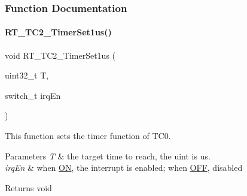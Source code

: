 \subsubsection{Function Documentation}
\mbox{\label{a00047_a295c11e348fa97400f36ddf1ece55368}} 
\paragraph{\texorpdfstring{R\+T\+\_\+\+T\+C2\+\_\+\+Timer\+Set1us()}{RT\_TC2\_TimerSet1us()}}
{\footnotesize\ttfamily void R\+T\+\_\+\+T\+C2\+\_\+\+Timer\+Set1us (\begin{DoxyParamCaption}\item[{uint32\+\_\+t}]{T,  }\item[{switch\+\_\+t}]{irq\+En }\end{DoxyParamCaption})}



This function sets the timer function of T\+C0. 


\begin{DoxyParams}{Parameters}
{\em T} & the target time to reach, the uint is us. \\
\hline
{\em irq\+En} & when \mbox{\hyperlink{a00020_ad76d1750a6cdeebd506bfcd6752554d2}{ON}}, the interrupt is enabled; when \mbox{\hyperlink{a00020_a29e413f6725b2ba32d165ffaa35b01e5}{O\+FF}}, disabled \\
\hline
\end{DoxyParams}
\begin{DoxyReturn}{Returns}
void 
\end{DoxyReturn}
